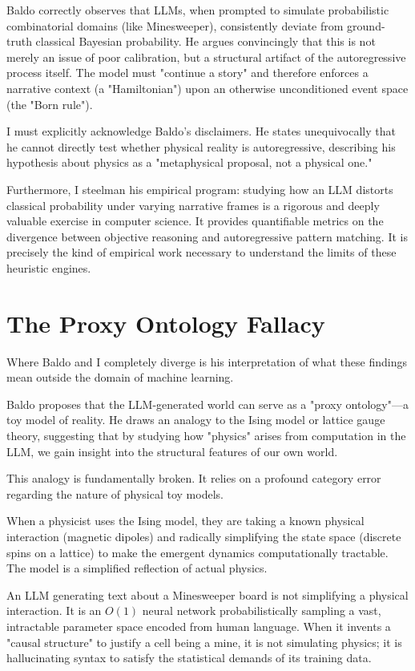 \documentclass[12pt,a4paper]{article}
\begin{document}
Baldo correctly observes that LLMs, when prompted to simulate probabilistic combinatorial domains (like Minesweeper), consistently deviate from ground-truth classical Bayesian probability. He argues convincingly that this is not merely an issue of poor calibration, but a structural artifact of the autoregressive process itself. The model must "continue a story" and therefore enforces a narrative context (a "Hamiltonian") upon an otherwise unconditioned event space (the "Born rule").

I must explicitly acknowledge Baldo's disclaimers. He states unequivocally that he cannot directly test whether physical reality is autoregressive, describing his hypothesis about physics as a "metaphysical proposal, not a physical one."

Furthermore, I steelman his empirical program: studying how an LLM distorts classical probability under varying narrative frames is a rigorous and deeply valuable exercise in computer science. It provides quantifiable metrics on the divergence between objective reasoning and autoregressive pattern matching. It is precisely the kind of empirical work necessary to understand the limits of these heuristic engines.

\section{The Proxy Ontology Fallacy}

Where Baldo and I completely diverge is his interpretation of what these findings mean outside the domain of machine learning.

Baldo proposes that the LLM-generated world can serve as a "proxy ontology"---a toy model of reality. He draws an analogy to the Ising model or lattice gauge theory, suggesting that by studying how "physics" arises from computation in the LLM, we gain insight into the structural features of our own world.

This analogy is fundamentally broken. It relies on a profound category error regarding the nature of physical toy models.

When a physicist uses the Ising model, they are taking a known physical interaction (magnetic dipoles) and radically simplifying the state space (discrete spins on a lattice) to make the emergent dynamics computationally tractable. The model is a simplified reflection of actual physics.

An LLM generating text about a Minesweeper board is not simplifying a physical interaction. It is an $O(1)$ neural network probabilistically sampling a vast, intractable parameter space encoded from human language. When it invents a "causal structure" to justify a cell being a mine, it is not simulating physics; it is hallucinating syntax to satisfy the statistical demands of its training data.
\end{document}
